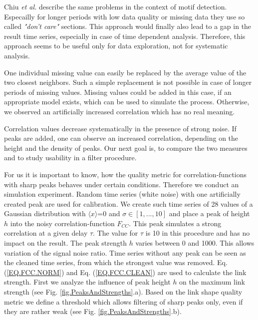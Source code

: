 \documentclass[a4paper,10pt]{scrbook}
\begin{document}
Chiu \textit{et al.} \cite{Chiu2003} describe the same problems in the context of motif detection. Especailly for longer periods with low data quality or missing data they use so called \textit{"don't care"} sections. This approach would finally also lead to a gap in the result time series, especially in case of time dependent analysis. Therefore, this approach seems to be useful only for data exploration, not for systematic analysis. 

One individual missing value can easily be replaced by the average value of the two closest neighbors. Such a simple replacement is not possible in case of longer periods of missing values. Missing values could be added in this case, if an appropriate model exists, which can be used to simulate the process. Otherwise, we observed an artificially increased correlation which has no real meaning.

Correlation values decrease systematically in the presence of strong noise. If peaks are added, one can observe an increased correlation, depending on the height and the density of peaks. Our next goal is, to compare the two measures and to study usability in a filter procedure.
 
For us it is important to know, how the quality metric for correlation-functions with sharp peaks behaves under certain conditions. Therefore we conduct an simulation experiment. Random time series (white noise) with one artificially created peak are used for calibration. We create such time series of 28 values of a Gaussian distribution with $ \langle x \rangle$=0 and $\sigma \in [1, ..., 10]$ and place a peak of height $h$ into the noisy correlation-function $F_{CC}$. This peak simulates a strong correlation at a given delay $\tau$. The value for $\tau$ is 10 in this procedure and has no impact on the result. The peak strength $h$ varies between 0 and 1000. This allows variation of the signal noise ratio. Time series without any peak can be seen as the cleaned time series, from which the strongest value was removed. Eq. (\ref{EQ.FCC.NORM}) and Eq. (\ref{EQ.FCC.CLEAN}) are used to calculate the link strength. First we analyze the influence of peak height $h$ on the maximum link strength (see Fig. \ref{fig.PeaksAndStrengths}.a). Based on the link shape quality metric we define a threshold which allows filtering of sharp peaks only, even if they are rather weak (see Fig. \ref{fig.PeaksAndStrengths}.b). 

\label{ext.fig.PeaksAndStrengths} 

\end{document}
